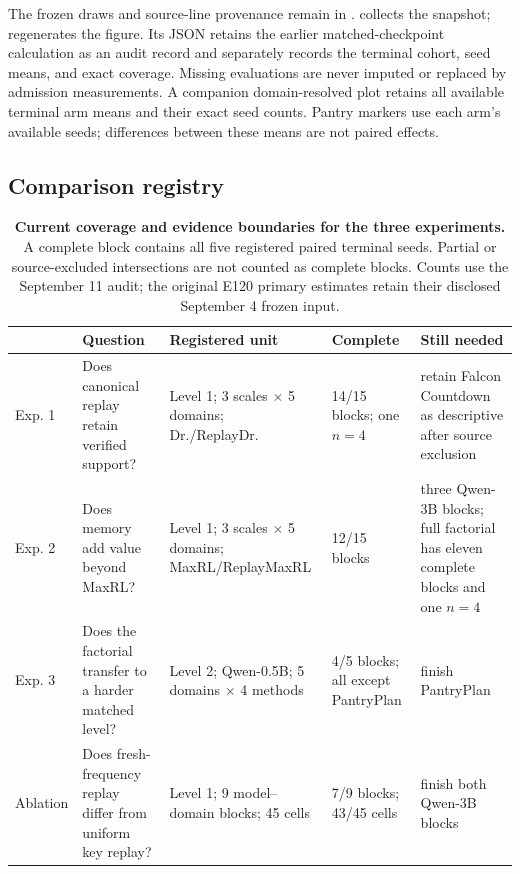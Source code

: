 \documentclass{article}
\newcommand{\1}{\mathbf 1}
\theoremstyle{remark}
\theoremstyle{definition}
\theoremstyle{plain}
\begin{document}
The frozen draws and source-line provenance remain in
.
 collects the snapshot;
 regenerates the figure.
Its JSON retains the earlier matched-checkpoint calculation as an audit
record and separately records the terminal cohort, seed means, and exact
coverage. Missing evaluations are never imputed or replaced by admission
measurements. A companion domain-resolved plot retains all available
terminal arm means and their exact seed counts. Pantry markers use each
arm's available seeds; differences between these means are not paired effects.

\subsection{Comparison registry}
\label{app:program-registry}

\begin{table}[H]
  \centering
  \caption{\textbf{Current coverage and evidence boundaries for the three
  experiments.} A complete block contains all five registered paired
  terminal seeds. Partial or source-excluded intersections are not counted as complete blocks.
  Counts use the September 11 audit; the original E120 primary estimates
  retain their disclosed September 4 frozen input.}
  \label{tab:experiment-map}
  \scriptsize
  \setlength{\tabcolsep}{3pt}
  \begin{tabularx}{\linewidth}{@{}P{.09\linewidth}P{.27\linewidth}P{.25\linewidth}P{.15\linewidth}Y@{}}
    \toprule
    & \textbf{Question} & \textbf{Registered unit} & \textbf{Complete} &
      \textbf{Still needed} \\
    \midrule
    Exp. 1 & Does canonical replay retain verified support? &
      Level 1; 3 scales $\times$ 5 domains; Dr./ReplayDr. &
      14/15 blocks; one $n=4$ & retain Falcon Countdown as descriptive after source exclusion \\
    Exp. 2 & Does memory add value beyond MaxRL? &
      Level 1; 3 scales $\times$ 5 domains; MaxRL/ReplayMaxRL &
      12/15 blocks & three Qwen-3B blocks; full factorial has eleven complete blocks and one $n=4$ \\
    Exp. 3 & Does the factorial transfer to a harder matched level? &
      Level 2; Qwen-0.5B; 5 domains $\times$ 4 methods &
      4/5 blocks; all except PantryPlan & finish PantryPlan \\
    Ablation & Does fresh-frequency replay differ from uniform key replay? &
      Level 1; 9 model--domain blocks; 45 cells &
      7/9 blocks; 43/45 cells & finish both Qwen-3B blocks \\
    \bottomrule
  \end{tabularx}
\end{table}
\end{document}
